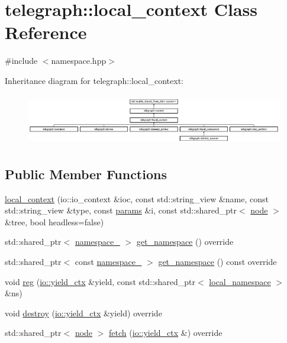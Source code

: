 \hypertarget{classtelegraph_1_1local__context}{}\section{telegraph\+:\+:local\+\_\+context Class Reference}
\label{classtelegraph_1_1local__context}


{\ttfamily \#include $<$namespace.\+hpp$>$}

Inheritance diagram for telegraph\+:\+:local\+\_\+context\+:\begin{figure}[H]
\begin{center}
\leavevmode
\includegraphics[height=2.258065cm]{classtelegraph_1_1local__context}
\end{center}
\end{figure}
\subsection*{Public Member Functions}
\begin{DoxyCompactItemize}
\item 
\hyperlink{classtelegraph_1_1local__context_a2f6fe87993dd07754131c5248c98c11d}{local\+\_\+context} (io\+::io\+\_\+context \&ioc, const std\+::string\+\_\+view \&name, const std\+::string\+\_\+view \&type, const \hyperlink{classtelegraph_1_1params}{params} \&i, const std\+::shared\+\_\+ptr$<$ \hyperlink{classtelegraph_1_1node}{node} $>$ \&tree, bool headless=false)
\item 
std\+::shared\+\_\+ptr$<$ \hyperlink{classtelegraph_1_1namespace__}{namespace\+\_\+} $>$ \hyperlink{classtelegraph_1_1local__context_a71a19090a93c3193615e61940fba918a}{get\+\_\+namespace} () override
\item 
std\+::shared\+\_\+ptr$<$ const \hyperlink{classtelegraph_1_1namespace__}{namespace\+\_\+} $>$ \hyperlink{classtelegraph_1_1local__context_aba1ff115df4b54bae75ea41580ba32b5}{get\+\_\+namespace} () const override
\item 
void \hyperlink{classtelegraph_1_1local__context_ab64632b088982a5f994708db99690f4f}{reg} (\hyperlink{structboost_1_1asio_1_1yield__ctx}{io\+::yield\+\_\+ctx} \&yield, const std\+::shared\+\_\+ptr$<$ \hyperlink{classtelegraph_1_1local__namespace}{local\+\_\+namespace} $>$ \&ns)
\item 
void \hyperlink{classtelegraph_1_1local__context_a301da16810636030a5098e4838587a99}{destroy} (\hyperlink{structboost_1_1asio_1_1yield__ctx}{io\+::yield\+\_\+ctx} \&yield) override
\item 
std\+::shared\+\_\+ptr$<$ \hyperlink{classtelegraph_1_1node}{node} $>$ \hyperlink{classtelegraph_1_1local__context_aefadafdf25e6f6ba23c4b332872836e2}{fetch} (\hyperlink{structboost_1_1asio_1_1yield__ctx}{io\+::yield\+\_\+ctx} \&) override
\end{DoxyCompactItemize}
